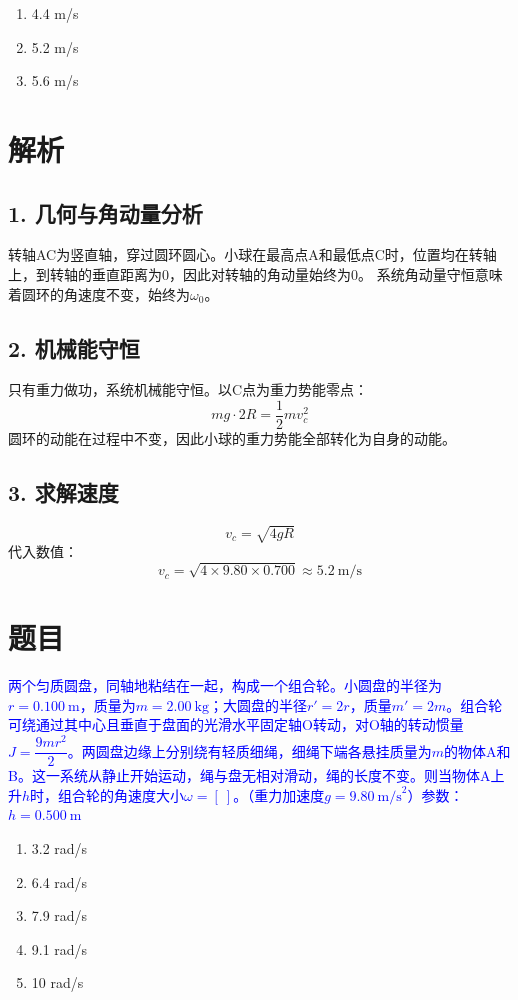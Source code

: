 \documentclass[11pt,a4paper]{article}
\begin{document}
\begin{enumerate}
    \item[A] 4.4 m/s
    \item[B] 5.2 m/s
    \item[C] 5.6 m/s
\end{enumerate}

\section*{解析}

\subsection*{1. 几何与角动量分析}
转轴AC为竖直轴，穿过圆环圆心。小球在最高点A和最低点C时，位置均在转轴上，到转轴的垂直距离为0，因此对转轴的角动量始终为0。
系统角动量守恒意味着圆环的角速度不变，始终为$\omega_0$。

\subsection*{2. 机械能守恒}
只有重力做功，系统机械能守恒。以C点为重力势能零点：
\[
mg\cdot 2R = \frac{1}{2}mv_c^2
\]
圆环的动能在过程中不变，因此小球的重力势能全部转化为自身的动能。

\subsection*{3. 求解速度}
\[
v_c = \sqrt{4gR}
\]
代入数值：
\[
v_c = \sqrt{4 \times 9.80 \times 0.700} \approx 5.2\ \text{m/s}
\]


\section*{题目}
\textcolor{blue}{两个匀质圆盘，同轴地粘结在一起，构成一个组合轮。小圆盘的半径为$r=0.100\ \text{m}$，质量为$m=2.00\ \text{kg}$；大圆盘的半径$r'=2r$，质量$m'=2m$。组合轮可绕通过其中心且垂直于盘面的光滑水平固定轴O转动，对O轴的转动惯量$J=\dfrac{9mr^2}{2}$。两圆盘边缘上分别绕有轻质细绳，细绳下端各悬挂质量为$m$的物体A和B。这一系统从静止开始运动，绳与盘无相对滑动，绳的长度不变。则当物体A上升$h$时，组合轮的角速度大小$\omega=[\ ]$。（重力加速度$g=9.80\ \text{m/s}^2$）参数：$h=0.500\ \text{m}$}

\begin{enumerate}
    \item[A] 3.2 rad/s
    \item[B] 6.4 rad/s
    \item[C] 7.9 rad/s
    \item[D] 9.1 rad/s
    \item[E] 10 rad/s
\end{enumerate}
\end{document}
